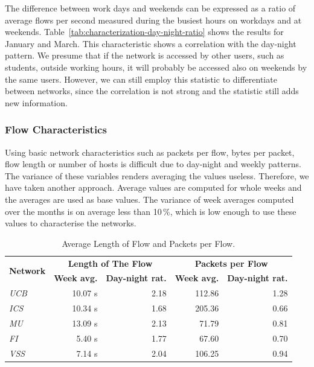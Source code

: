 The difference between work days and weekends can be expressed as a ratio of average flows per second measured during the busiest hours on workdays and at weekends. Table~\ref{tab:characterization-day-night-ratio} shows the results for January and March. This characteristic shows a correlation with the day-night pattern. 
We presume that if the network is accessed by other users, such as students, outside working hours, it will probably be accessed also on weekends by the same users.
However, we can still employ this statistic to differentiate between networks, since the correlation is not strong and the statistic still adds new information.

\subsubsection{Flow Characteristics}

Using basic network characteristics such as packets per flow, bytes per packet, flow length or number of hosts is difficult due to day-night and weekly patterns. The variance of these variables renders averaging the values useless. Therefore, we have taken another approach. Average values are computed for whole weeks and the averages are used as base values. The variance of week averages computed over the months is on average less than 10\,\%, which is low enough to use these values to characterise the networks. 

\begin{table}[!t]
        \centering
        \renewcommand{\arraystretch}{1.1}
        \setlength{\tabcolsep}{5pt}
        \begin{tabular}{|l|r|r|r|r|} \hline
                \multirow{2}{*}{\centering\textbf{Network}} & \multicolumn{2}{c|}{\textbf{Length of The Flow}} & \multicolumn{2}{c|}{\textbf{Packets per Flow}} \\ \cline{2-5}
                  & \textbf{Week avg.} & \textbf{Day-night rat.} & \textbf{Week avg.} & \textbf{Day-night rat.} \\ \hline
                \textit{UCB} &  10.07 s & 2.18 &  112.86 & 1.28 \\ \hline
                \textit{ICS} & 10.34 s & 1.68 & 205.36 &  0.66 \\  \hline
                \textit{MU} & 13.09 s & 2.13 & 71.79  & 0.81 \\  \hline
                \textit{FI} & 5.40 s & 1.77 & 67.60 & 0.70 \\  \hline
                \textit{VSS} & 7.14 s & 2.04 & 106.25 & 0.94 \\  \hline
        \end{tabular}
        \caption{Average Length of Flow and Packets per Flow.}
        \label{tab:characterization-avg-lengths}
\end{table}

